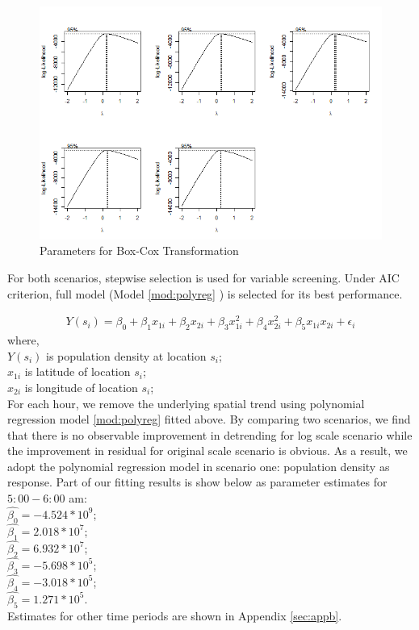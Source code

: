 \documentclass[hidelinks,12pt]{article}
\begin{document}
	\begin{figure}[!ht]
		\includegraphics[width=\textwidth]{boxcox.png}
		\caption{Parameters for Box-Cox Transformation\label{fig:boxcox}}
	\end{figure}
	\FloatBarrier	
	
	For both scenarios, stepwise selection is used for variable screening. Under AIC criterion, full model (Model \ref{mod:polyreg} ) is selected for its best performance.
	
	\begin{align}
	\label{mod:polyreg}
	Y(s_i)=\beta_0 +\beta_1x_{1i} +\beta_2x_{2i} +\beta_3x_{1i}^2 +\beta_4x_{2i}^2+\beta_5x_{1i}x_{2i}+\epsilon_i
	\end{align}
	where,\\
	$Y(s_i)$ is population density at location $s_i$;\\
	$x_{1i}$ is latitude of location $s_i$;\\
	$x_{2i}$ is longitude of location $s_i$;\\	
	
	For each hour, we remove the underlying spatial trend using polynomial regression model \ref{mod:polyreg} fitted above. By comparing two scenarios, we find that there is no observable improvement in detrending for log scale scenario while the improvement in residual for original scale scenario is obvious. As a result, we adopt the polynomial regression model in scenario one: population density as response. Part of our fitting results is show below as parameter estimates for $5:00-6:00$ am:\\
	\indent $\hat{\beta_0}=-4.524*10^9$;\\
	\indent$\hat{\beta_1}=2.018*10^7$;\\
	\indent$\hat{\beta_2}=6.932*10^7$;\\
	\indent$\hat{\beta_3}=-5.698*10^5$;\\
	\indent$\hat{\beta_4}=-3.018*10^5$;\\
	\indent$\hat{\beta_5}=1.271*10^5$.\\
	Estimates for other time periods are shown in Appendix \ref{sec:appb}.
	
\end{document}
